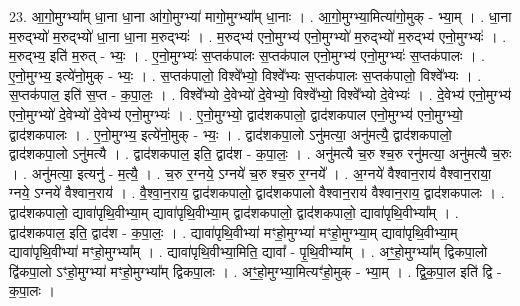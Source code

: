 \documentclass[17pt]{extarticle}
\begin{document}
23. आ॒गो॒मुग्भ्या᳚म् धा॒ना धा॒ना आ॑गो॒मुग्भ्या॑ मागो॒मुग्भ्या᳚म् धा॒नाः । . आ॒गो॒मुग्भ्या॒मित्या॑गो॒मुक् - भ्या॒म् । . धा॒ना म॒रुद्भ्यो॑ म॒रुद्भ्यो॑ धा॒ना धा॒ना म॒रुद्भ्यः॑ । . म॒रुद्भ्य॑ एनो॒मुग्भ्य॑ एनो॒मुग्भ्यो॑ म॒रुद्भ्यो॑ म॒रुद्भ्य॑ एनो॒मुग्भ्यः॑ । . म॒रुद्भ्य॒ इति॑ म॒रुत् - भ्यः॒ । . ए॒नो॒मुग्भ्यः॑ स॒प्तक॑पालः स॒प्तक॑पाल एनो॒मुग्भ्य॑ एनो॒मुग्भ्यः॑ स॒प्तक॑पालः । . ए॒नो॒मुग्भ्य॒ इत्ये॑नो॒मुक् - भ्यः॒ । . स॒प्तक॑पालो॒ विश्वे᳚भ्यो॒ विश्वे᳚भ्यः स॒प्तक॑पालः स॒प्तक॑पालो॒ विश्वे᳚भ्यः । . स॒प्तक॑पाल॒ इति॑ स॒प्त - क॒पा॒लः॒ । . विश्वे᳚भ्यो दे॒वेभ्यो॑ दे॒वेभ्यो॒ विश्वे᳚भ्यो॒ विश्वे᳚भ्यो दे॒वेभ्यः॑ । . दे॒वेभ्य॑ एनो॒मुग्भ्य॑ एनो॒मुग्भ्यो॑ दे॒वेभ्यो॑ दे॒वेभ्य॑ एनो॒मुग्भ्यः॑ । . ए॒नो॒मुग्भ्यो॒ द्वाद॑शकपालो॒ द्वाद॑शकपाल एनो॒मुग्भ्य॑ एनो॒मुग्भ्यो॒ द्वाद॑शकपालः । . ए॒नो॒मुग्भ्य॒ इत्ये॑नो॒मुक् - भ्यः॒ । . द्वाद॑शकपा॒लो ऽनु॑मत्या॒ अनु॑मत्यै॒ द्वाद॑शकपालो॒ द्वाद॑शकपा॒लो ऽनु॑मत्यै । . द्वाद॑शकपाल॒ इति॒ द्वाद॑श - क॒पा॒लः॒ । . अनु॑मत्यै च॒रु श्च॒रु रनु॑मत्या॒ अनु॑मत्यै च॒रुः । . अनु॑मत्या॒ इत्यनु॑ - म॒त्यै॒ । . च॒रु र॒ग्नये॒ ऽग्नये॑ च॒रु श्च॒रु र॒ग्नये᳚ । . अ॒ग्नये॑ वैश्वान॒राय॑ वैश्वान॒राया॒ ग्नये॒ ऽग्नये॑ वैश्वान॒राय॑ । . वै॒श्वा॒न॒राय॒ द्वाद॑शकपालो॒ द्वाद॑शकपालो वैश्वान॒राय॑ वैश्वान॒राय॒ द्वाद॑शकपालः । . द्वाद॑शकपालो॒ द्यावा॑पृथि॒वीभ्या॒म् द्यावा॑पृथि॒वीभ्या॒म् द्वाद॑शकपालो॒ द्वाद॑शकपालो॒ द्यावा॑पृथि॒वीभ्या᳚म् । . द्वाद॑शकपाल॒ इति॒ द्वाद॑श - क॒पा॒लः॒ । . द्यावा॑पृथि॒वीभ्या॑ मꣳहो॒मुग्भ्या॑ मꣳहो॒मुग्भ्या॒म् द्यावा॑पृथि॒वीभ्या॒म् द्यावा॑पृथि॒वीभ्या॑ मꣳहो॒मुग्भ्या᳚म् । . द्यावा॑पृथि॒वीभ्या॒मिति॒ द्यावा᳚ - पृ॒थि॒वीभ्या᳚म् । . अꣳ॒॒हो॒मुग्भ्या᳚म् द्विकपा॒लो द्वि॑कपा॒लो ऽꣳहो॒मुग्भ्या॑ मꣳहो॒मुग्भ्या᳚म् द्विकपा॒लः । . अꣳ॒॒हो॒मुग्भ्या॒मित्यꣳ॑हो॒मुक् - भ्या॒म् । . द्वि॒क॒पा॒ल इति॑ द्वि - क॒पा॒लः । \newline
\end{document}
